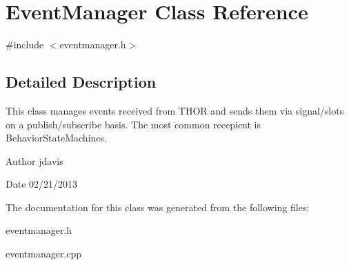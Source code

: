 \hypertarget{classEventManager}{\section{Event\-Manager Class Reference}
\label{classEventManager}
}


{\ttfamily \#include $<$eventmanager.\-h$>$}



\subsection{Detailed Description}
This class manages events received from T\-H\-O\-R and sends them via signal/slots on a publish/subscribe basis. The most common recepient is Behavior\-State\-Machines.

\begin{DoxyAuthor}{Author}
jdavis 
\end{DoxyAuthor}
\begin{DoxyDate}{Date}
02/21/2013 
\end{DoxyDate}


The documentation for this class was generated from the following files\-:\begin{DoxyCompactItemize}
\item 
eventmanager.\-h\item 
eventmanager.\-cpp\end{DoxyCompactItemize}
